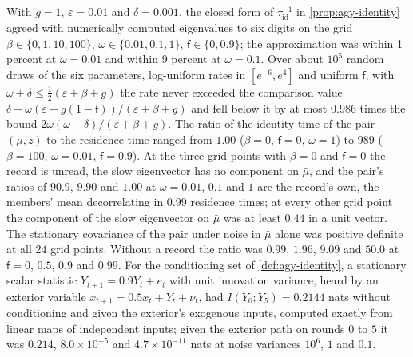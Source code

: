 \begin{numcheck}\label{chk:agy-identity}
With $g=1$, $\varepsilon=0.01$ and $\delta=0.001$, the closed form of $\tau_{\mathrm{id}}^{-1}$ in \cref{prop:agy-identity} agreed with numerically computed eigenvalues to six digits on the grid $\beta\in\{0,1,10,100\}$, $\omega\in\{0.01,0.1,1\}$, $\mathsf f\in\{0,0.9\}$; the approximation was within 1 percent at $\omega=0.01$ and within 9 percent at $\omega=0.1$. Over about $10^5$ random draws of the six parameters, log-uniform rates in $[e^{-6},e^{4}]$ and uniform $\mathsf f$, with $\omega+\delta\le\frac12(\varepsilon+\beta+g)$ the rate never exceeded the comparison value $\delta+\omega(\varepsilon+g(1-\mathsf f))/(\varepsilon+\beta+g)$ and fell below it by at most $0.986$ times the bound $2\omega(\omega+\delta)/(\varepsilon+\beta+g)$. The ratio of the identity time of the pair $(\bar\mu,z)$ to the residence time ranged from $1.00$ ($\beta=0$, $\mathsf f=0$, $\omega=1$) to $989$ ($\beta=100$, $\omega=0.01$, $\mathsf f=0.9$). At the three grid points with $\beta=0$ and $\mathsf f=0$ the record is unread, the slow eigenvector has no component on $\bar\mu$, and the pair's ratios of $90.9$, $9.90$ and $1.00$ at $\omega=0.01$, $0.1$ and $1$ are the record's own, the members' mean decorrelating in $0.99$ residence times; at every other grid point the component of the slow eigenvector on $\bar\mu$ was at least $0.44$ in a unit vector. The stationary covariance of the pair under noise in $\bar\mu$ alone was positive definite at all $24$ grid points. Without a record the ratio was $0.99$, $1.96$, $9.09$ and $50.0$ at $\mathsf f=0$, $0.5$, $0.9$ and $0.99$. For the conditioning set of \cref{def:agy-identity}, a stationary scalar statistic $Y_{t+1}=0.9Y_t+e_t$ with unit innovation variance, heard by an exterior variable $x_{t+1}=0.5x_t+Y_t+\nu_t$, had $I(Y_0;Y_5)=0.2144$ nats without conditioning and given the exterior's exogenous inputs, computed exactly from linear maps of independent inputs; given the exterior path on rounds $0$ to $5$ it was $0.214$, $8.0\times10^{-5}$ and $4.7\times10^{-11}$ nats at noise variances $10^{6}$, $1$ and $0.1$.
\end{numcheck}

